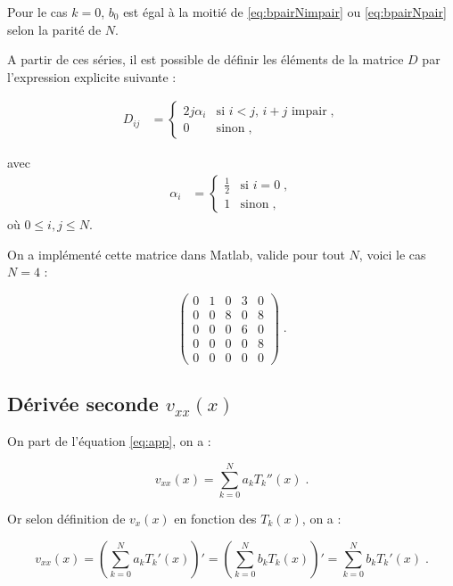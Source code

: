 \documentclass{report}
\begin{document}
Pour le cas $k=0$, $b_{0}$ est égal à la moitié de \eqref{eq:bpairNimpair} ou \eqref{eq:bpairNpair} selon la parité de $N$.

A partir de ces séries, il est possible de définir les éléments de la matrice $D$ par l'expression explicite suivante :

\begin{align}
D_{ij} &= 
  \begin{cases}
    2j\alpha_{i} & \text{si $i<j$, $i+j$ impair}\;, \\
0 & \text{sinon}\;,
  \end{cases}
  \end{align}
  
  avec 
  \begin{align}
\alpha_{i} &= 
  \begin{cases}
    \frac{1}{2} & \text{si $i =0$}\;, \\
1 & \text{sinon}\;,
  \end{cases}
  \end{align}
où $0 \leq i,j \leq N$.



On a implémenté cette matrice dans Matlab, valide pour tout $N$, voici le cas $N=4$ :

\begin{equation}
\begin{pmatrix}
0 & 1 & 0 & 3 & 0\\ 
0 & 0 & 8 & 0 & 8\\ 
0 & 0 & 0 & 6 & 0\\ 
0 & 0 & 0 & 0 & 8\\ 
0 & 0 & 0 & 0 & 0
\end{pmatrix} \;.
\end{equation}

\subsection*{Dérivée seconde $v_{xx}(x)$}

On part de l'équation \eqref{eq:app}, on a :

\begin{equation}
v_{xx}(x) = \sum_{k=0}^N a_k T_{k}''(x)\;.\label{eq:vxxa}
\end{equation}

Or selon définition de $v_{x}(x)$ en fonction des $T_{k}(x)$, on a :

\begin{equation}
v_{xx}(x) = \left(\sum_{k=0}^N a_k T_{k}'(x)\right)' = \left(\sum_{k=0}^N b_k T_k(x)\right)' = \sum_{k=0}^N b_k T_{k}'(x) \;.
\end{equation}
\end{document}
